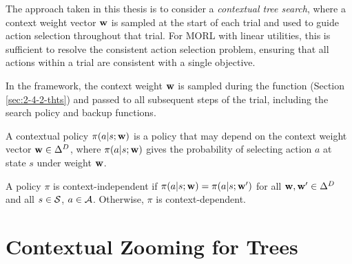     The approach taken in this thesis is to consider a \textit{contextual tree search}, where a context weight vector $\mathbf{w}$ is sampled at the start of each trial and used to guide action selection throughout that trial. For MORL with linear utilities, this is sufficient to resolve the consistent action selection problem, ensuring that all actions within a trial are consistent with a single objective.

    \begin{sloppypar}
    In the \mbox{\thtspp} framework, the context weight $\mathbf{w}$ is sampled during the \mbox{\samplecontext} function (Section \ref{sec:2-4-2-thts}) and passed to all subsequent steps of the trial, including the search policy and backup functions. 
    \end{sloppypar}

    \begin{defn}
        \label{def:5:context_policy}
        A \textnormal{contextual policy} $\pi(a|s;\mathbf{w})$ is a 
        policy that may depend on the context weight vector 
        $\mathbf{w}\in\Delta^{D}$, where $\pi(a|s;\mathbf{w})$ gives 
        the probability of selecting action $a$ at state $s$ under 
        weight $\mathbf{w}$.

        A policy $\pi$ is \textnormal{context-independent} if
        $\pi(a|s;\mathbf{w}) = \pi(a|s;\mathbf{w}')$ for all
        $\mathbf{w},\mathbf{w}'\in\Delta^{D}$ and all $s\in\mathcal{S}$,
        $a\in\mathcal{A}$. Otherwise, $\pi$ is
        \textnormal{context-dependent}.
    \end{defn}



















\section{Contextual Zooming for Trees}
\label{sec:5-2-czt}

